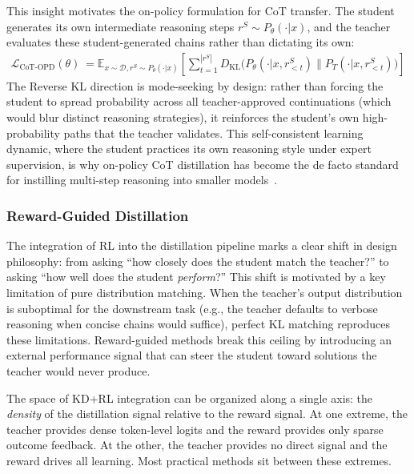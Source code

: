 \documentclass{article} %
\newcommand{\KL}{D_{\mathrm{KL}}}
\begin{document}
This insight motivates the on-policy formulation for CoT transfer. The student generates its own intermediate reasoning steps $r^S \sim P_\theta(\cdot|x)$, and the teacher evaluates these student-generated chains rather than dictating its own:
\begin{align}
\mathcal{L}_{\text{CoT-OPD}}(\theta) &= \mathbb{E}_{x \sim \mathcal{D}, r^S \sim P_\theta(\cdot|x)} \left[ \sum_{t=1}^{|r^S|} \KL \Big( P_\theta(\cdot | x, r^S_{<t}) \parallel P_T(\cdot | x, r^S_{<t}) \Big) \right] \label{eq:cot_opd}
\end{align}
The Reverse KL direction is mode-seeking by design: rather than forcing the student to spread probability across all teacher-approved continuations (which would blur distinct reasoning strategies), it reinforces the student's own high-probability paths that the teacher validates. This self-consistent learning dynamic, where the student practices its own reasoning style under expert supervision, is why on-policy CoT distillation has become the de facto standard for instilling multi-step reasoning into smaller models~\citep{2305.02301}.

\subsubsection{Reward-Guided Distillation}

The integration of RL into the distillation pipeline marks a clear shift in design philosophy: from asking ``how closely does the student match the teacher?'' to asking ``how well does the student \emph{perform}?'' This shift is motivated by a key limitation of pure distribution matching. When the teacher's output distribution is suboptimal for the downstream task (e.g., the teacher defaults to verbose reasoning when concise chains would suffice), perfect KL matching reproduces these limitations. Reward-guided methods break this ceiling by introducing an external performance signal that can steer the student toward solutions the teacher would never produce.

The space of KD+RL integration can be organized along a single axis: the \emph{density} of the distillation signal relative to the reward signal. At one extreme, the teacher provides dense token-level logits and the reward provides only sparse outcome feedback. At the other, the teacher provides no direct signal and the reward drives all learning. Most practical methods sit between these extremes.
\end{document}

